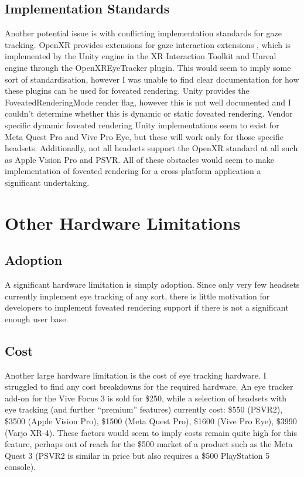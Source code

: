 \documentclass[a4paper,11pt]{article}
\begin{document}
\subsection{Implementation Standards}
Another potential issue is with conflicting implementation standards for gaze tracking. OpenXR provides extensions for gaze interaction extensions \cite{xr_gaze}, which is implemented by the Unity engine in the XR Interaction Toolkit \cite{xr_gaze_unity} and Unreal engine through the OpenXREyeTracker plugin\cite{xr_gaze_unreal}. This would seem to imply some sort of standardisation, however I was unable to find clear documentation for how these plugins can be used for foveated rendering. Unity provides the FoveatedRenderingMode render flag\cite{unity_fove}, however this is not well documented and I couldn't determine whether this is dynamic or static foveated rendering. Vendor specific dynamic foveated rendering Unity implementations seem to exist for Meta Quest Pro\cite{meta_unity} and Vive Pro Eye\cite{vive_unity}, but these will work only for those specific headsets. Additionally, not all headsets support the OpenXR standard at all such as Apple Vision Pro and PSVR\cite{openxr_conform}. All of these obstacles would seem to make implementation of foveated rendering for a cross-platform application a significant undertaking.

\section{Other Hardware Limitations}
\subsection{Adoption}
A significant hardware limitation is simply adoption. Since only very few headsets currently implement eye tracking of any sort, there is little motivation for developers to implement foveated rendering support if there is not a significant enough user base.

\subsection{Cost}
Another large hardware limitation is the cost of eye tracking hardware. I struggled to find any cost breakdowns for the required hardware. An eye tracker add-on for the Vive Focus 3 is sold for \$250\cite{eye_cost_vive}, while a selection of headsets with eye tracking (and further ``premium'' features) currently cost: \$550 (PSVR2\cite{psvr_price}), \$3500 (Apple Vision Pro\cite{vision_pro_price}), \$1500 (Meta Quest Pro\cite{quest_pro_price}), \$1600 (Vive Pro Eye\cite{vive_pro_eye}), \$3990 (Varjo XR-4\cite{varjo_price}). These factors would seem to imply costs remain quite high for this feature, perhaps out of reach for the \$500\cite{quest_three_price} market of a product such as the Meta Quest 3 (PSVR2 is similar in price but also requires a \$500 PlayStation 5 console\cite{psfive_price}).
\end{document}
